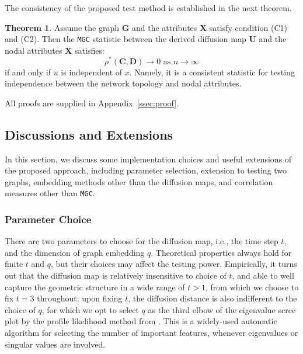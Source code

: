 \documentclass[11pt]{article}
\theoremstyle{definition}
\newtheorem{theorem}{Theorem}
\begin{document}
The consistency of the proposed test method is established in the next theorem.

\begin{theorem}
Assume the graph $\mathbf{G}$ and the attributes $\mathbf{X}$ satisfy condition (C1) and (C2). Then the \texttt{MGC} statistic between the derived diffusion map $\mathbf{U}$ and the nodal attributes $\mathbf{X}$ satisfies:
\begin{equation}
\rho^{*}(\mathbf{C}, \mathbf{D}) \longrightarrow 0 \mbox{ as } n \rightarrow \infty
\end{equation}
if and only if $u$ is independent of $x$. Namely, it is a consistent statistic for testing independence between the network topology and nodal attributes.
	\label{theoremMain}
\end{theorem} 

All proofs are supplied in Appendix~\ref{ssec:proof}.

\subsection{Discussions and Extensions}
\label{ss:dis}
 
In this section, we discuss some implementation choices and useful extensions of the proposed approach, including parameter selection, extension to testing two graphs, embedding methods other than the diffusion maps, and correlation measures other than \texttt{MGC}. 

\subsubsection*{Parameter Choice}

There are two parameters to choose for the diffusion map, i.e., the time step $t$, and the dimension of graph embedding $q$. Theoretical properties always hold for finite $t$ and $q$, but their choices may affect the testing power. Empirically, it turns out that the diffusion map is relatively insensitive to choice of $t$, and able to well capture the geometric structure in a wide range of $t>1$, from which we choose to fix $t=3$ throughout; upon fixing $t$, the diffusion distance is also indifferent to the choice of $q$, for which we opt to select $q$ as the third elbow of the eigenvalue scree plot by the profile likelihood method from \cite{ZhuGhodsi2006}. This is a widely-used automatic algorithm for selecting the number of important features, whenever eigenvalues or singular values are involved. 
\end{document}

